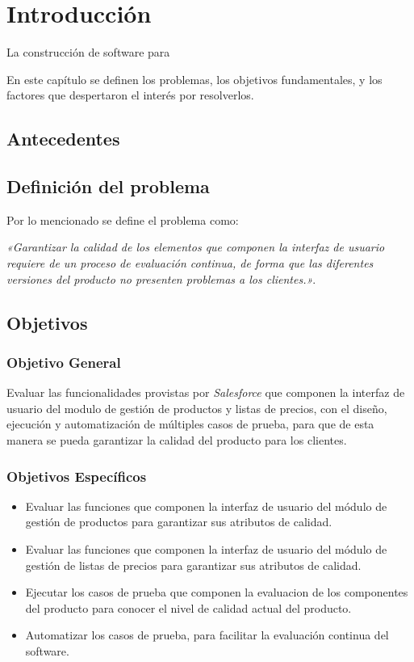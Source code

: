 \chapter{Introducción}

La construcción de software para 

En este capítulo se definen los problemas, los objetivos fundamentales, y los
factores que despertaron el interés por resolverlos.

\section{Antecedentes}

\section{Definición del problema}
Por lo mencionado se define el problema como:

\emph{«Garantizar la calidad de los elementos que componen la interfaz de
usuario requiere de un proceso de evaluación continua, de forma que las
diferentes versiones del producto no presenten problemas a los clientes.»}.

\section{Objetivos}

\subsection{Objetivo General}
Evaluar las funcionalidades provistas por \emph{Salesforce} que componen la
interfaz de usuario del modulo de gestión de productos y listas de precios, con
el diseño, ejecución y automatización de múltiples casos de prueba, para que de
esta manera se pueda garantizar la calidad del producto para los clientes.

\subsection{Objetivos Específicos}
\begin{itemize}
\item Evaluar las funciones que componen la interfaz de usuario del módulo de
    gestión de productos para garantizar sus atributos de calidad.
\item Evaluar las funciones que componen la interfaz de usuario del módulo de
    gestión de listas de precios para garantizar sus atributos de calidad.
\item Ejecutar los casos de prueba que componen la evaluacion de los
    componentes del producto para conocer el nivel de calidad actual del
    producto.
\item Automatizar los casos de prueba, para facilitar la evaluación continua del
    software.
\end{itemize}

